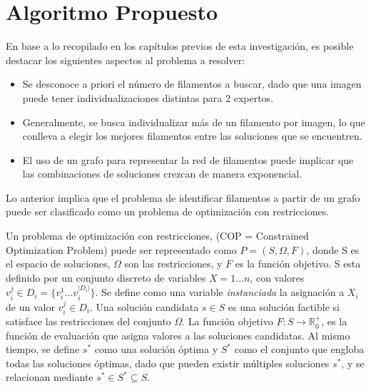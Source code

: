 \chapter{Algoritmo Propuesto}
\label{sec:modeloOpti}

En base a lo recopilado en los cap\'itulos previos de esta investigaci\'on, es posible destacar los siguientes aspectos al problema a resolver:

\begin{itemize}
    \item Se desconoce a priori el n\'umero de filamentos a buscar, dado que una imagen puede tener individualizaciones distintas para 2 expertos.
    \item Generalmente, se busca individualizar m\'as de un filamento por imagen, lo que conlleva a elegir los mejores filamentos entre las soluciones que se encuentren.
    \item El uso de un grafo para representar la red de filamentos puede implicar que las combinaciones de soluciones crezcan de manera exponencial.
\end{itemize}

Lo anterior implica que el problema de identificar filamentos a partir de un grafo puede ser clasificado como un problema de optimizaci\'on con restricciones\cite{blum2011hybrid}.

Un problema de optimización con restricciones, (COP = Constrained Optimization Problem) puede ser representado como $P = (S, \Omega, F)$, donde S es el espacio de soluciones, $\Omega$ son las restricciones, y $F$ es la funci\'on objetivo. S esta definido por un conjunto discreto de variables $X = 1 \dotsc n$, con valores $v_{i}^{j} \in D_{i} = \{v_{i}^{1} \dotsc  v_{i}^{|D_{i}|}\}$. Se define como una variable {\it instanciada} la asignaci\'on a $X_i$ de un valor $v_{i}^{j} \in D_i$. Una solución candidata $s \in S$ es una soluci\'on factible si satisface las restricciones del conjunto $\Omega$. La funci\'on objetivo $F: S\rightarrow \mathbb R_{0}^{+}$, es la funci\'on de evaluaci\'on que asigna valores a las soluciones candidatas. Al mismo tiempo, se define $s^{*}$ como una soluci\'on \'optima y $S^{*}$ como el conjunto que engloba todas las soluciones \'optimas, dado que pueden existir m\'ultiples soluciones $s^{*}$, y se relacionan mediante $s^{*} \in S^{*} \subseteq S $\cite{socha2008ant}.

